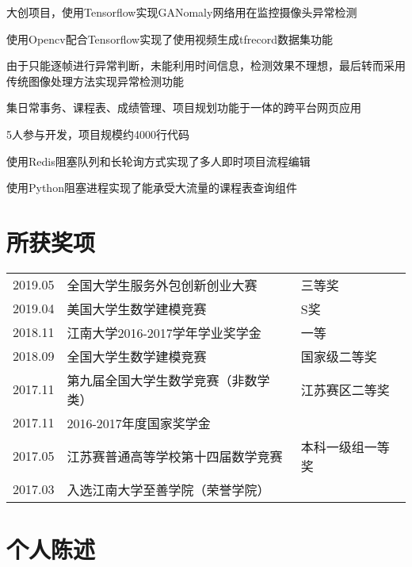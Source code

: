 \documentclass[]{deedy-resume-openfont}
\begin{document}
\begin{minipage}[t]{0.73\textwidth}
	\begin{tightemize}
		\item 大创项目，使用Tensorflow实现GANomaly网络用在监控摄像头异常检测
		\item 使用Opencv配合Tensorflow实现了使用视频生成tfrecord数据集功能
		\item 由于只能逐帧进行异常判断，未能利用时间信息，检测效果不理想，最后转而采用 传统图像处理方法实现异常检测功能
	\end{tightemize}
    \sectionsep
    
	\begin{tightemize}
		\item 集日常事务、课程表、成绩管理、项目规划功能于一体的跨平台网页应用
		\item 5人参与开发，项目规模约4000行代码
		\item 使用Redis阻塞队列和长轮询方式实现了多人即时项目流程编辑
		\item 使用Python阻塞进程实现了能承受大流量的课程表查询组件
	\end{tightemize}
	\sectionsep

	\section{所获奖项}
    \begin{tabular}{lll}
        2019.05 & 全国大学生服务外包创新创业大赛 & 三等奖 \\
        2019.04 & 美国大学生数学建模竞赛 & S奖 \\
        2018.11 & 江南大学2016-2017学年学业奖学金 & 一等 \\
        2018.09 & 全国大学生数学建模竞赛 & 国家级二等奖 \\
        2017.11 & 第九届全国大学生数学竞赛（非数学类） & 江苏赛区二等奖 \\
        2017.11 & 2016-2017年度国家奖学金 & \\
        2017.05 & 江苏赛普通高等学校第十四届数学竞赛 & 本科一级组一等奖\\
        2017.03 & 入选江南大学至善学院（荣誉学院）& \\
	\end{tabular}
    \sectionsep
    
    \section{个人陈述}

\end{minipage}
\end{document}
